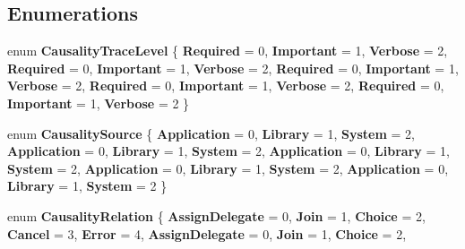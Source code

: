 \subsection*{Enumerations}
\begin{DoxyCompactItemize}
\item 
\mbox{\label{namespace_windows_1_1_foundation_1_1_diagnostics_aa82022f66e6c5b053464b95c6479f156}} 
enum {\bfseries Causality\+Trace\+Level} \{ \newline
{\bfseries Required} = 0, 
{\bfseries Important} = 1, 
{\bfseries Verbose} = 2, 
{\bfseries Required} = 0, 
\newline
{\bfseries Important} = 1, 
{\bfseries Verbose} = 2, 
{\bfseries Required} = 0, 
{\bfseries Important} = 1, 
\newline
{\bfseries Verbose} = 2, 
{\bfseries Required} = 0, 
{\bfseries Important} = 1, 
{\bfseries Verbose} = 2, 
\newline
{\bfseries Required} = 0, 
{\bfseries Important} = 1, 
{\bfseries Verbose} = 2
 \}
\item 
\mbox{\label{namespace_windows_1_1_foundation_1_1_diagnostics_a3a370b356cb758e027ffea6414919c72}} 
enum {\bfseries Causality\+Source} \{ \newline
{\bfseries Application} = 0, 
{\bfseries Library} = 1, 
{\bfseries System} = 2, 
{\bfseries Application} = 0, 
\newline
{\bfseries Library} = 1, 
{\bfseries System} = 2, 
{\bfseries Application} = 0, 
{\bfseries Library} = 1, 
\newline
{\bfseries System} = 2, 
{\bfseries Application} = 0, 
{\bfseries Library} = 1, 
{\bfseries System} = 2, 
\newline
{\bfseries Application} = 0, 
{\bfseries Library} = 1, 
{\bfseries System} = 2
 \}
\item 
\mbox{\label{namespace_windows_1_1_foundation_1_1_diagnostics_a45d3c9f2fddbec91a3035d3e79a246c8}} 
enum {\bfseries Causality\+Relation} \{ \newline
{\bfseries Assign\+Delegate} = 0, 
{\bfseries Join} = 1, 
{\bfseries Choice} = 2, 
{\bfseries Cancel} = 3, 
\newline
{\bfseries Error} = 4, 
{\bfseries Assign\+Delegate} = 0, 
{\bfseries Join} = 1, 
{\bfseries Choice} = 2, 

\end{DoxyCompactItemize}

